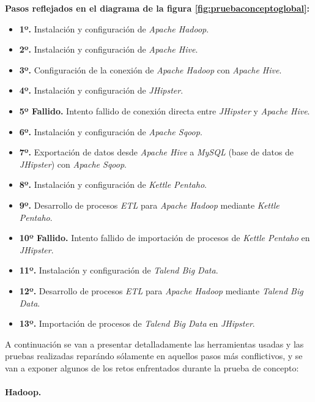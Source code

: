 \textbf{Pasos reflejados en el diagrama de la figura \ref{fig:pruebaconceptoglobal}:}
\begin{itemize}
\item \textbf{1º.} Instalación y configuración de \textit{Apache Hadoop}.
\item \textbf{2º.} Instalación y configuración de \textit{Apache Hive}.
\item \textbf{3º.} Configuración de la conexión de \textit{Apache Hadoop} con \textit{Apache Hive}.
\item \textbf{4º.} Instalación y configuración de \textit{JHipster}.
\item \textbf{5º Fallido.} Intento fallido de conexión directa entre \textit{JHipster} y \textit{Apache Hive}.
\item \textbf{6º.} Instalación y configuración de \textit{Apache Sqoop}. 
\item \textbf{7º.} Exportación de datos desde \textit{Apache Hive} a \textit{MySQL} (base de datos de \textit{JHipster}) con \textit{Apache Sqoop}.
\item \textbf{8º.} Instalación y configuración de \textit{Kettle Pentaho}.
\item \textbf{9º.} Desarrollo de procesos \textit{ETL} para \textit{Apache Hadoop} mediante \textit{Kettle Pentaho}.
\item \textbf{10º Fallido.} Intento fallido de importación de procesos de \textit{Kettle Pentaho} en \textit{JHipster}.
\item \textbf{11º.} Instalación y configuración de\textit{ Talend Big Data}.
\item \textbf{12º.} Desarrollo de procesos \textit{ETL} para \textit{Apache Hadoop }mediante \textit{Talend Big Data}.
\item \textbf{13º.} Importación de procesos de \textit{Talend Big Data} en \textit{JHipster}.
\end{itemize}

A continuación se van a presentar detalladamente las herramientas usadas y las pruebas realizadas reparándo sólamente en aquellos pasos más conflictivos, y se van a exponer algunos de los retos enfrentados durante la prueba de concepto: 
\bigskip
\par
\paragraph*{Hadoop.}

